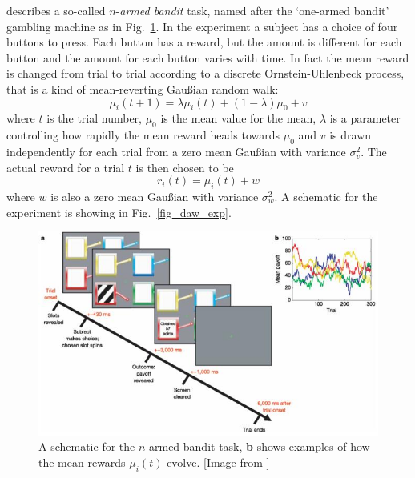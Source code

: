 \documentclass[12pt]{article}
\begin{document}
\citet{DawEtAl2006} describes a so-called $n$-\textsl{armed bandit}
task, named after the \lq{}one-armed bandit\rq{} gambling machine as
in Fig.~\ref{fig_one_armed}. In the experiment a subject has a choice
of four buttons to press. Each button has a reward, but the amount is
different for each button and the amount for each button varies with
time. In fact the mean reward is changed from trial to trial according to a
discrete Ornstein-Uhlenbeck process, that is a kind of mean-reverting
Gau\ss{}ian random walk:
\begin{equation}
\mu_i(t+1)=\lambda \mu_i(t)+(1-\lambda)\mu_0+v
\end{equation}
where $t$ is the trial number, $\mu_0$ is the mean value for the mean,
$\lambda$ is a parameter controlling how rapidly the mean reward heads
towards $\mu_0$ and $v$ is drawn independently for each trial from a
zero mean Gau\ss{}ian with variance $\sigma_v^2$. The actual reward
for a trial $t$ is then chosen to be
\begin{equation}
r_i(t)=\mu_i(t)+w
\end{equation}
where $w$ is also a zero mean Gau\ss{}ian with variance $\sigma_w^2$.
A schematic for the experiment is showing in Fig.~\ref{fig_daw_exp}.

\begin{figure}[htb]
\begin{center}
\includegraphics[width=12cm]{fig_daw_exp.jpg}
\end{center}
\caption{A schematic for the $n$-armed bandit task, \textbf{b} shows examples of how the mean rewards $\mu_i(t)$  evolve. [Image from \citep{DawEtAl2006}]\label{fig_one_armed}}
\end{figure}
\end{document}
